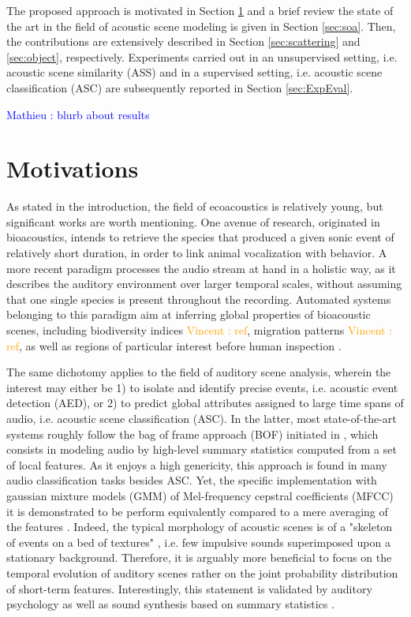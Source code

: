 \documentclass[journal]{IEEEtran}
\makeatletter
\newcommand*{\ie}{i.e.\@\xspace}
\newcommand{\vl}[1]{\textcolor{orange}{Vincent : #1}}
\newcommand{\ml}[1]{\textcolor{blue}{ Mathieu : #1}}
\makeatother
\begin{document}
The proposed approach is motivated in Section \ref{sec:motivations} and a brief review the state of the art in the field of acoustic scene modeling is given in Section \ref{sec:soa}. Then, the contributions are extensively described in Section \ref{sec:scattering} and \ref{sec:object}, respectively. Experiments carried out in an unsupervised setting, \ie acoustic scene similarity (ASS) and in a supervised setting, \ie acoustic scene classification (ASC) are subsequently reported in Section \ref{sec:ExpEval}.

\ml{blurb about results}

\section{Motivations} \label{sec:motivations}

As stated in the introduction, the field of ecoacoustics is relatively young, but significant works are worth mentioning.
One avenue of research, originated in bioacoustics, intends to retrieve the species that produced a given sonic event of relatively short duration, in order to link animal vocalization with behavior\cite{au2008principles, stowell2014large}.
A more recent paradigm processes the audio stream at hand in a holistic way, as it describes the auditory environment over larger temporal scales, without assuming that one single species is present throughout the recording. Automated systems belonging to this paradigm aim at inferring global properties of bioacoustic scenes, including biodiversity indices \vl{ref}, migration patterns \vl{ref}, as well as regions of particular interest before human inspection \cite{rosenstock2002landbird,diefenbach2007incorporating}.

The same dichotomy applies to the field of auditory scene analysis, wherein the interest may either be 1) to isolate and identify precise events, \ie acoustic event detection (AED), or 2) to predict global attributes assigned to large time spans of audio, \ie acoustic scene classification (ASC).
In the latter, most state-of-the-art systems roughly follow the bag of frame approach (BOF) initiated in \cite{aucouturier2007bag}, which consists in modeling audio by high-level summary statistics computed from a set of local features.
As it enjoys a high genericity, this approach is found in many audio classification tasks besides ASC.
Yet, the specific implementation with gaussian mixture models (GMM) of Mel-frequency cepstral coefficients (MFCC) it is demonstrated to be perform equivalently compared to a mere averaging of the features  \cite{lagrange:hal-01082501}.
Indeed, the typical morphology of acoustic scenes is of a "skeleton of events on a bed of textures" \cite{nelken_ear_2013}, \ie few impulsive sounds superimposed upon a stationary background.
Therefore, it is arguably more beneficial to focus on the temporal evolution of auditory scenes rather on the joint probability distribution of short-term features.
Interestingly, this statement is validated by auditory psychology as well as sound synthesis based  on summary statistics \cite{mcdermott2013summary}.
\end{document}
